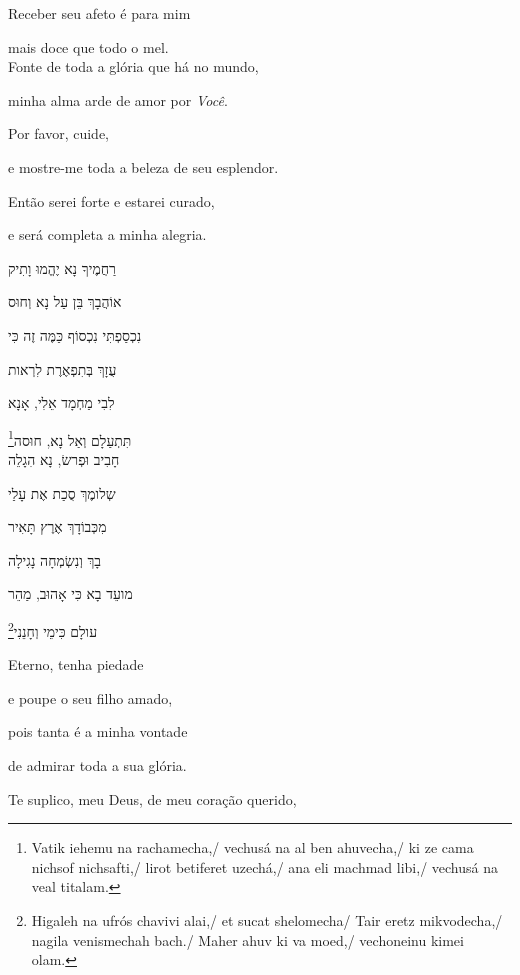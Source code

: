Receber seu afeto é para mim

mais doce que todo o mel.\\[10pt]

{Fonte de toda a glória que há no mundo},

minha alma arde de amor por \emph{Você}.

Por favor, cuide,

e mostre-me toda a beleza de seu esplendor.

Então serei forte e estarei curado,

e será completa a minha alegria.\\[10pt]

\movetoevenpage
\raggedleft

\vspace*{1cm}

רַחֲמֶיךָ נָא יֶהֱמוּ וָתִיק \label{ref02}

אוֹהֲבָךְ בֵּן עַל נָא וְחוּס 

נִכְסַפְתִּי נִכְסוֹף כַּמֶּה זֶה כִּי 

עֻזָךְ בְּתִפְאֶרֶת לִרְאות 

לִבִי מַחְמָד אֵלִי, אָנָא 

\footnote{Vatik iehemu na rachamecha,/
vechusá na al ben ahuvecha,/ ki ze cama nichsof nichsafti,/ lirot betiferet uzechá,/
ana eli machmad libi,/ vechusá na veal titalam.}תִּתְעַלָם וְאַל נָא, חוּסה\\[10pt]

חָבִיב וּפְרשׂ, נָא הִגָלֵה

שְלומֶךְ סֻכַת אֶת עָלַי 

מִכְּבוֹדָךְ אֶרֶץ תָּאִיר 

בָךְ וְנִשְׂמְחָה נָגִילָה 

מועֵד בָא כִּי אָהוּב, מַהֵר

\footnote{
Higaleh na ufrós chavivi alai,/
et sucat shelomecha/ Tair eretz mikvodecha,/ nagila venismechah bach./ Maher ahuv ki va moed,/
vechoneinu kimei olam.}עולָם כִּימֵי וְחָנֵנִי

\movetooddpage
\raggedright

\vspace*{1cm}

Eterno, tenha piedade

e poupe o seu filho amado,

pois tanta é a minha vontade

de admirar toda a sua glória.

Te suplico, meu Deus, de meu coração querido,

